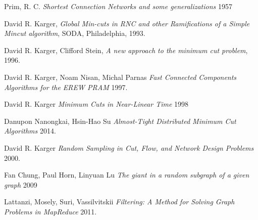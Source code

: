 \documentclass{article}
\begin{document}
\begin{thebibliography}{9}

  Prim, R. C.
  \emph{Shortest Connection Networks and some generalizations}
  1957

  David R. Karger,
  \emph{Global Min-cuts in RNC and other Ramifications of a Simple Mincut algorithm},
  SODA, Philadelphia,
  1993.

  David R. Karger, Clifford Stein,
  \emph{A new approach to the minimum cut problem},
  1996.

  David R. Karger, Noam Nisan, Michal Parnas
  \emph{Fast Connected Components Algorithms for the EREW PRAM}
  1997.

  David R. Karger
  \emph{Minimum Cuts in Near-Linear Time}
  1998

  Danupon Nanongkai, Hsin-Hao Su
  \emph{Almost-Tight Distributed Minimum Cut Algorithms}
  2014.

  David R. Karger
  \emph{Random Sampling in Cut, Flow, and Network Design Problems}
  2000.

  Fan Chung, Paul Horn, Linyuan Lu
  \emph{The giant in a random subgraph of a given graph}
  2009

  Lattanzi, Mosely, Suri, Vassilvitskii
  \emph{Filtering: A Method for Solving Graph Problems in MapReduce}
  2011.

\end{thebibliography}
\end{document}

